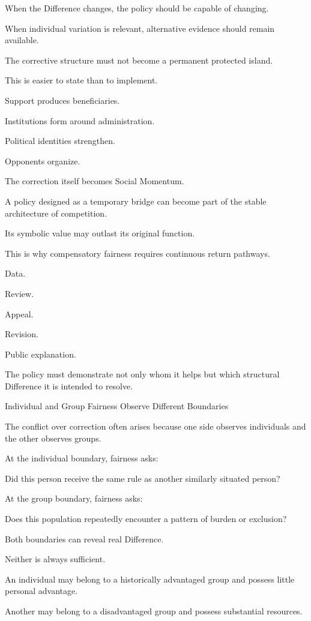 When the Difference changes, the policy should be capable of changing.

When individual variation is relevant, alternative evidence should remain available.

The corrective structure must not become a permanent protected island.

This is easier to state than to implement.

Support produces beneficiaries.

Institutions form around administration.

Political identities strengthen.

Opponents organize.

The correction itself becomes Social Momentum.

A policy designed as a temporary bridge can become part of the stable architecture of competition.

Its symbolic value may outlast its original function.

This is why compensatory fairness requires continuous return pathways.

Data.

Review.

Appeal.

Revision.

Public explanation.

The policy must demonstrate not only whom it helps but which structural Difference it is intended to resolve.

Individual and Group Fairness Observe Different Boundaries

The conflict over correction often arises because one side observes individuals and the other observes groups.

At the individual boundary, fairness asks:

Did this person receive the same rule as another similarly situated person?

At the group boundary, fairness asks:

Does this population repeatedly encounter a pattern of burden or exclusion?

Both boundaries can reveal real Difference.

Neither is always sufficient.

An individual may belong to a historically advantaged group and possess little personal advantage.

Another may belong to a disadvantaged group and possess substantial resources.

